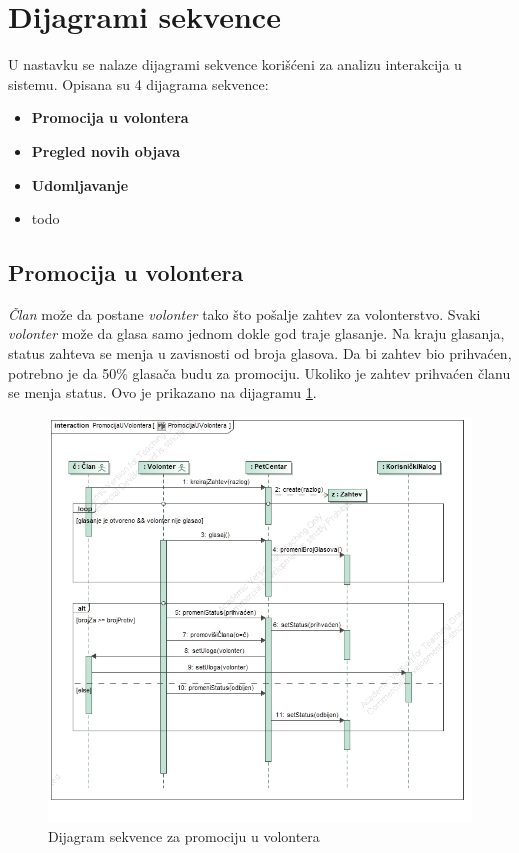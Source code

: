 \section{Dijagrami sekvence}
\par U nastavku se nalaze dijagrami sekvence korišćeni za analizu interakcija u sistemu. Opisana su 4 dijagrama sekvence:
\begin{itemize}
    \item \textbf{Promocija u volontera}
    \item \textbf{Pregled novih objava}
    \item \textbf{Udomljavanje}
    \item todo
\end{itemize}
\subsection{Promocija u volontera}
\par \textit{Član} može da postane \textit{volonter} tako što pošalje zahtev za volonterstvo. Svaki \textit{volonter} može da glasa samo jednom dokle god traje glasanje. 
Na kraju glasanja, status zahteva se menja u zavisnosti od broja glasova. Da bi zahtev bio prihvaćen,
potrebno je da 50\% glasača budu za promociju. Ukoliko je zahtev prihvaćen članu se menja status. Ovo je prikazano na dijagramu \ref{fig:promotion-seq}.
\begin{figure}[h]
    \centering
    \includegraphics[width=\textwidth, height=0.9\textwidth]{img/promote-member-sequence.jpg}
    \caption{Dijagram sekvence za promociju u volontera}
    \label{fig:promotion-seq}
\end{figure}
